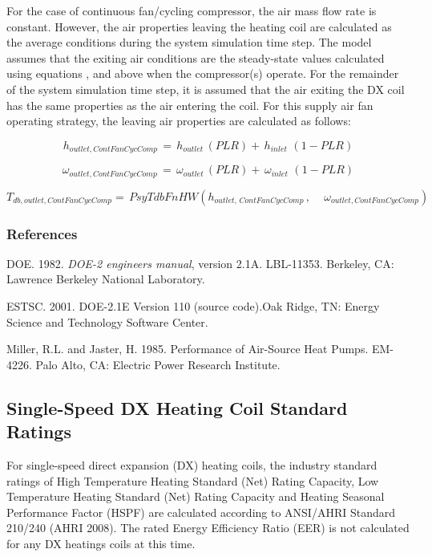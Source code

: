 For the case of continuous fan/cycling compressor, the air mass flow rate is constant. However, the air properties leaving the heating coil are calculated as the average conditions during the system simulation time step. The model assumes that the exiting air conditions are the steady-state values calculated using equations , and above when the compressor(s) operate. For the remainder of the system simulation time step, it is assumed that the air exiting the DX coil has the same properties as the air entering the coil. For this supply air fan operating strategy, the leaving air properties are calculated as follows:

\begin{equation}
{h_{outlet,ContFanCycComp}}\, = \,{h_{outlet}}\,\left( {PLR} \right) + \,{h_{inlet}}\,\,\left( {1 - PLR} \right)
\end{equation}

\begin{equation}
{\omega_{outlet,ContFanCycComp}}\, = \,{\omega_{outlet}}\,\left( {PLR} \right) + \,{\omega_{inlet}}\,\,\left( {1 - PLR} \right)
\end{equation}

\begin{equation}
{T_{db,outlet,ContFanCycComp}} = \,PsyTdbFnHW({h_{outlet,\,ContFanCycComp}}\,,\,\,\,\,\,\,\,{\omega_{outlet,ContFanCycComp}})
\end{equation}

\subsubsection{References}\label{references-5-001}

DOE. 1982. \emph{DOE-2 engineers manual}, version 2.1A. LBL-11353. Berkeley, CA: Lawrence Berkeley National Laboratory.

ESTSC. 2001. DOE-2.1E Version 110 (source code).Oak Ridge, TN: Energy Science and Technology Software Center.

Miller, R.L. and Jaster, H. 1985. Performance of Air-Source Heat Pumps. EM-4226. Palo Alto, CA: Electric Power Research Institute.

\subsection{Single-Speed DX Heating Coil Standard Ratings}\label{single-speed-dx-heating-coil-standard-ratings}

For single-speed direct expansion (DX) heating coils, the industry standard ratings of High Temperature Heating Standard (Net) Rating Capacity, Low Temperature Heating Standard (Net) Rating Capacity and Heating Seasonal Performance Factor (HSPF) are calculated according to ANSI/AHRI Standard 210/240 (AHRI 2008). The rated Energy Efficiency Ratio (EER) is not calculated for any DX heatings coils at this time.

